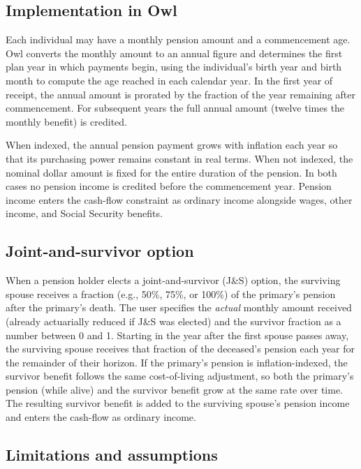 \documentclass[fleqn,12pt]{report}
\begin{document}
\subsection*{Implementation in Owl}

Each individual may have a monthly pension amount and a commencement age.
Owl converts the monthly amount to an annual figure and determines the
first plan year in which payments begin, using the individual's birth year
and birth month to compute the age reached in each calendar year.
In the first year of receipt, the annual amount is prorated by the fraction
of the year remaining after commencement.
For subsequent years the full annual amount (twelve times the monthly benefit)
is credited.

When indexed, the annual pension payment grows with inflation each year so
that its purchasing power remains constant in real terms.
When not indexed, the nominal dollar amount is fixed for the entire
duration of the pension.
In both cases no pension income is credited before the commencement year.
Pension income enters the cash-flow constraint as ordinary income
alongside wages, other income, and Social Security benefits.

\subsection*{Joint-and-survivor option}

When a pension holder elects a joint-and-survivor (J\&S) option, the surviving
spouse receives a fraction (e.g., 50\%, 75\%, or 100\%) of the primary's
pension after the primary's death.
The user specifies the \emph{actual} monthly amount received (already
actuarially reduced if J\&S was elected) and the survivor fraction as a number
between 0 and 1.
Starting in the year after the first spouse passes away, the surviving spouse
receives that fraction of the deceased's pension each year for the remainder of
their horizon.
If the primary's pension is inflation-indexed, the survivor benefit follows the
same cost-of-living adjustment, so both the primary's pension (while alive) and
the survivor benefit grow at the same rate over time.
The resulting survivor benefit is added to the surviving spouse's pension income
and enters the cash-flow as ordinary income.

\subsection*{Limitations and assumptions}
\end{document}
